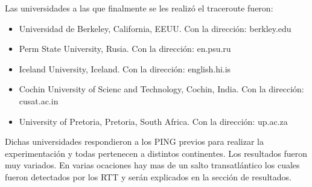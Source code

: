 \begin{itemize}
\end{itemize}

Las universidades a las que finalmente se les realizó el traceroute fueron:

\begin{itemize}
	\item Universidad de Berkeley, California, EEUU. Con la dirección: berkley.edu
	\item Perm State University, Rusia. Con la dirección: en.psu.ru
	\item Iceland University, Iceland. Con la dirección: english.hi.is
	\item Cochin University of Scienc and Technology, Cochin, India. Con la dirección: cusat.ac.in
	\item University of Pretoria, Pretoria, South Africa. Con la dirección: up.ac.za
\end{itemize}

Dichas universidades respondieron a los PING previos para realizar la experimentación y todas pertenecen a distintos continentes. Los resultados fueron muy variados. En varias ocaciones hay mas de un salto transatlántico los cuales fueron detectados por los RTT y serán explicados en la sección de resultados.
